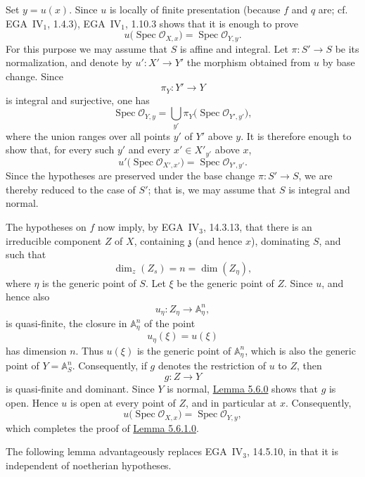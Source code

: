 Set \(y=u(x)\). Since \(u\) is locally of finite presentation
(because \(f\) and \(q\) are; cf. EGA~IV\(_1\), 1.4.3),
EGA~IV\(_1\), 1.10.3 shows that it is enough to prove
\[
  u\bigl(\operatorname{Spec}\mathcal O_{X,x}\bigr)
  =\operatorname{Spec}\mathcal O_{Y,y}.
\]
For this purpose we may assume that \(S\) is affine and integral.
Let \(\pi:S'\to S\) be its normalization, and denote by
\(u':X'\to Y'\) the morphism obtained from \(u\) by base change.
Since
\[
  \pi_Y:Y'\longrightarrow Y
\]
is integral and surjective, one has
\[
  \operatorname{Spec}\mathcal O_{Y,y}
  =
  \bigcup_{y'}
  \pi_Y\bigl(\operatorname{Spec}\mathcal O_{Y',y'}\bigr),
\]
where the union ranges over all points \(y'\) of \(Y'\) above
\(y\). It is therefore enough to show that, for every such
\(y'\) and every \(x'\in X'_{y'}\) above \(x\),
\[
  u'\bigl(\operatorname{Spec}\mathcal O_{X',x'}\bigr)
  =\operatorname{Spec}\mathcal O_{Y',y'}.
\]
Since the hypotheses are preserved under the base change
\(\pi:S'\to S\), we are thereby reduced to the case of \(S'\);
that is, we may assume that \(S\) is integral and normal.

The hypotheses on \(f\) now imply, by EGA~IV\(_3\), 14.3.13, that
there is an irreducible component \(Z\) of \(X\), containing
\(\mathfrak z\) (and hence \(x\)), dominating \(S\), and such that
\[
  \dim_z(Z_s)=n=\dim(Z_\eta),
\]
where \(\eta\) is the generic point of \(S\). Let \(\xi\) be the
generic point of \(Z\). Since \(u\), and hence also
\[
  u_\eta:Z_\eta\longrightarrow\mathbb A^n_\eta,
\]
is quasi-finite, the closure in \(\mathbb A^n_\eta\) of the point
\[
  u_\eta(\xi)=u(\xi)
\]
has dimension \(n\). Thus \(u(\xi)\) is the generic point of
\(\mathbb A^n_\eta\), which is also the generic point of
\(Y=\mathbb A^n_S\). Consequently, if \(g\) denotes the
restriction of \(u\) to \(Z\), then
\[
  g:Z\longrightarrow Y
\]
is quasi-finite and dominant. Since \(Y\) is normal, \hyperref[lem:sga3-VIB-5.6.0]{Lemma 5.6.0}
shows that \(g\) is open. Hence \(u\) is open at every point of
\(Z\), and in particular at \(x\). Consequently,
\[
  u\bigl(\operatorname{Spec}\mathcal O_{X,x}\bigr)
  =\operatorname{Spec}\mathcal O_{Y,y},
\]
which completes the proof of \hyperref[lem:sga3-VIB-5.6.1.0]{Lemma 5.6.1.0}.

The following lemma advantageously replaces
EGA~IV\(_3\), 14.5.10,%
in that it is independent of noetherian hypotheses.
